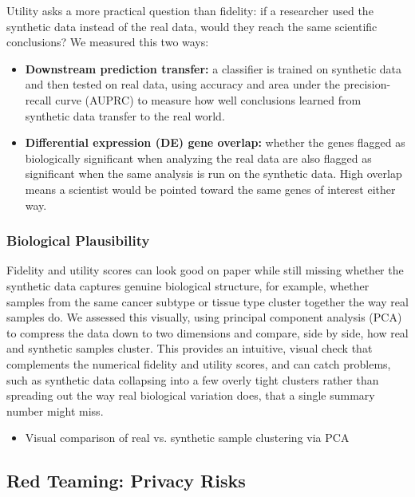 Utility asks a more practical question than fidelity: if a researcher used the synthetic data instead of the real data, would they reach the same scientific conclusions? We measured this two ways:

\begin{itemize}
  \item \textbf{Downstream prediction transfer:} a classifier is trained
        on synthetic data and then tested on real data, using accuracy
        and area under the precision-recall curve (AUPRC) to measure how
        well conclusions learned from synthetic data transfer to the real
        world.
  \item \textbf{Differential expression (DE) gene overlap:} whether the
        genes flagged as biologically significant when analyzing the real
        data are also flagged as significant when the same analysis is
        run on the synthetic data. High overlap means a scientist would
        be pointed toward the same genes of interest either way.
\end{itemize}

\subsubsection{Biological Plausibility}

Fidelity and utility scores can look good on paper while still missing whether the synthetic data captures genuine biological structure, for example, whether samples from the same cancer subtype or tissue type cluster together the way real samples do. We assessed this visually, using principal component analysis (PCA) to compress the data down to two dimensions and compare, side by side, how real and synthetic samples cluster. This provides an intuitive, visual check that complements the numerical fidelity and utility scores, and can catch problems, such as synthetic data collapsing into a few overly tight clusters rather than spreading out the way real biological variation does, that a single summary number might miss.

\begin{itemize}
  \item Visual comparison of real vs. synthetic sample clustering via PCA
\end{itemize}

\subsection{Red Teaming: Privacy Risks}

